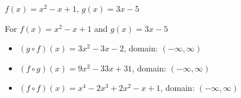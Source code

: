 {$f(x) = x^2 -x+1$, $g(x) = 3x-5$ }
{ For  $f(x) = x^2 -x+1$ and $g(x) = 3x-5$ 

\begin{itemize}

\item  $(g \circ f)(x) = 3x^2-3x-2$, domain: $(-\infty, \infty)$

\item  $(f \circ g)(x) =9x^2-33x+31$, domain: $(-\infty, \infty)$

\item  $(f \circ f)(x) = x^4-2x^3+2x^2-x+1$, domain: $(-\infty, \infty)$

\end{itemize}}
